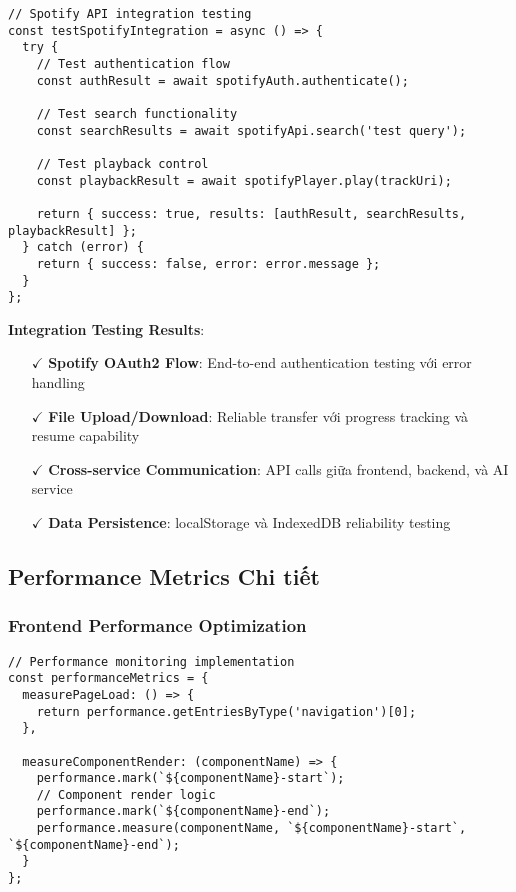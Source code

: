 \documentclass[12pt,a4paper]{article}
\begin{document}
\begin{lstlisting}[caption={Spotify API integration testing}]
// Spotify API integration testing
const testSpotifyIntegration = async () => {
  try {
    // Test authentication flow
    const authResult = await spotifyAuth.authenticate();
    
    // Test search functionality
    const searchResults = await spotifyApi.search('test query');
    
    // Test playback control
    const playbackResult = await spotifyPlayer.play(trackUri);
    
    return { success: true, results: [authResult, searchResults, playbackResult] };
  } catch (error) {
    return { success: false, error: error.message };
  }
};
\end{lstlisting}

\textbf{Integration Testing Results}:
\begin{itemize}
\item[$\checkmark$] \textbf{Spotify OAuth2 Flow}: End-to-end authentication testing với error handling
\item[$\checkmark$] \textbf{File Upload/Download}: Reliable transfer với progress tracking và resume capability
\item[$\checkmark$] \textbf{Cross-service Communication}: API calls giữa frontend, backend, và AI service
\item[$\checkmark$] \textbf{Data Persistence}: localStorage và IndexedDB reliability testing
\end{itemize}

\subsection{Performance Metrics Chi tiết}

\subsubsection{Frontend Performance Optimization}

\begin{lstlisting}[caption={Performance monitoring implementation}]
// Performance monitoring implementation
const performanceMetrics = {
  measurePageLoad: () => {
    return performance.getEntriesByType('navigation')[0];
  },
  
  measureComponentRender: (componentName) => {
    performance.mark(`${componentName}-start`);
    // Component render logic
    performance.mark(`${componentName}-end`);
    performance.measure(componentName, `${componentName}-start`, `${componentName}-end`);
  }
};
\end{lstlisting}
\end{document}
